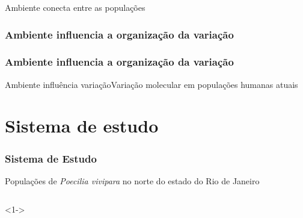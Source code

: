 \documentclass{beamer}
\begin{document}
\begin{frame}{Ambiente conecta entre as populações}
   \centering

  \end{frame}

  \begin{frame}
      \frametitle{Ambiente influencia a organiza\c{c}ão da varia\c{c}ão}

  \centering

   \end{frame}

\begin{frame}
  \frametitle{Ambiente influencia a organiza\c{c}ão da varia\c{c}ão}
\centering
  \centering
\end{frame}


\begin{frame}{Ambiente influência variação}{Varia\c{c}ão molecular em popula\c{c}ões humanas atuais}

   \centering
  

\end{frame}


\section{Sistema de estudo}
\begin{frame}
  \frametitle{Sistema de Estudo}{Popula\c{c}ões de \textit{Poecilia vivipara } no norte do estado do Rio de Janeiro}
  \begin{columns}
    

    \begin{column}{4cm}
      \centering

      
      <1->\\

    \end{column}
    \begin{column}{8cm}
     \pause
       \centering
      \\
     \end{column}

   \end{columns}

\end{frame}
\end{document}
